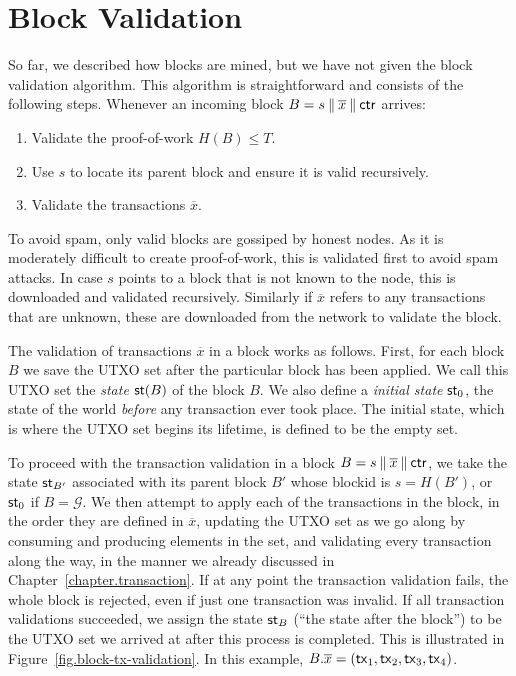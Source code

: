 \section{Block Validation}

So far, we described how blocks are mined, but we have not given the block validation algorithm.
This algorithm is straightforward and consists of the following steps. Whenever an incoming
block $B = s \mathbin{\|} \overline{x} \mathbin{\|} \mathsf{ctr}$ arrives:

\begin{enumerate}
    \item Validate the proof-of-work $H(B) \leq T$.
    \item Use $s$ to locate its parent block and ensure it is valid recursively.
    \item Validate the transactions $\overline{x}$.
\end{enumerate}

To avoid spam, only valid blocks are gossiped by honest nodes. As it is moderately difficult to
create proof-of-work, this is validated first to avoid spam attacks. In case $s$ points to a block
that is not known to the node, this is downloaded and validated recursively. Similarly if
$\overline{x}$ refers to any transactions that are unknown, these are downloaded from the network
to validate the block.

The validation of transactions
$\overline{x}$ in a block works as follows.
First, for each block $B$ we save the UTXO set after the particular block has been applied.
We call this UTXO set the \emph{state} $\mathsf{st}(B)$ of the block $B$.
We also define a \emph{initial state} $\mathsf{st}_0$, the state of the world \emph{before}
any transaction ever
took place. The initial state, which is where the UTXO set begins its lifetime, is defined to be the
empty set.

To proceed with the transaction validation in a block $B = s \mathbin{\|} \overline{x} \mathbin{\|} \mathsf{ctr}$, we take the state
$\mathsf{st}_{B'}$ associated with
its parent block $B'$ whose blockid is $s = H(B')$, or $\mathsf{st}_0$ if $B = \mathcal{G}$.
We then attempt to apply each of the transactions in the block, in the order
they are defined in $\overline{x}$, updating the UTXO set as we go along by consuming
and producing elements in the set, and validating
every transaction along the way, in the manner we already discussed in Chapter~\ref{chapter.transaction}.
If at any point the transaction validation fails, the whole block is rejected,
even if just one transaction was invalid. If all transaction validations succeeded,
we assign the state $\mathsf{st}_B$ (``the state after the block'') to be the UTXO set we arrived at after
this process is completed. This is illustrated in Figure~\ref{fig.block-tx-validation}.
In this example, $B.\overline{x} = (\mathsf{tx}_1, \mathsf{tx}_2, \mathsf{tx}_3, \mathsf{tx}_4)$.

